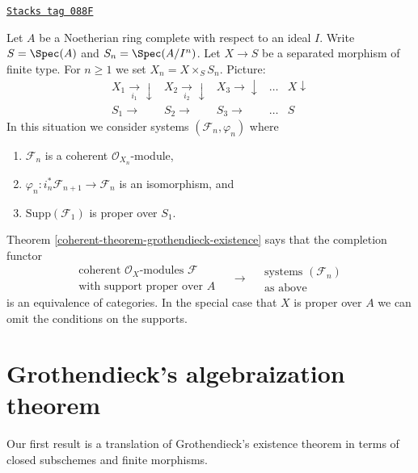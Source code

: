 \begin{remark}

\label{coherent-remark-reformulate-existence-theorem}
\href{https://stacks.math.columbia.edu/tag/088F}{\texttt{Stacks tag 088F}}

Let $A$ be a Noetherian ring complete with respect to an ideal $I$.
Write $S = \Spec(A)$ and $S_n = \Spec(A/I^n)$.
Let $X \to S$ be a separated morphism of finite type.
For $n \geq 1$ we set $X_n = X \times_S S_n$.
Picture:
$$
\begin{array}{ccccc}X_1 \underset{i_1}{\longrightarrow}\downarrow & X_2 \underset{i_2}{\longrightarrow}\downarrow & X_3 \longrightarrow\downarrow & \ldots & X \downarrow \\ S_1 \longrightarrow & S_2 \longrightarrow & S_3 \longrightarrow & \ldots & S\end{array}
$$
In this situation we consider systems $(\mathcal{F}_n, \varphi_n)$
where
\begin{enumerate}
\item $\mathcal{F}_n$ is a coherent $\mathcal{O}_{X_n}$-module,
\item $\varphi_n : i_n^*\mathcal{F}_{n + 1} \to \mathcal{F}_n$
is an isomorphism, and
\item $\text{Supp}(\mathcal{F}_1)$ is proper over $S_1$.
\end{enumerate}
Theorem \ref{coherent-theorem-grothendieck-existence} says that the
completion functor
$$
\begin{matrix}
\text{coherent }\mathcal{O}_X\text{-modules }\mathcal{F} \\
\text{with support proper over }A
\end{matrix}
\quad
\longrightarrow
\quad
\begin{matrix}
\text{systems }(\mathcal{F}_n) \\
\text{as above}
\end{matrix}
$$
is an equivalence of categories. In the special case that $X$ is
proper over $A$ we can omit the conditions on the supports.
\end{remark}

\section{Grothendieck's algebraization theorem}
\label{coherent-section-algebraization}
Our first result is a translation of Grothendieck's existence
theorem in terms of closed subschemes and finite morphisms.

